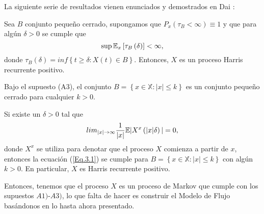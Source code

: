 La siguiente serie de resultados vienen enunciados y demostrados
en Dai \cite{Dai}:
\begin{Lema}
Sea $B$ conjunto peque\~no cerrado, supongamos que
$P_{x}\left(\tau_{B}<\infty\right)\equiv1$ y que para alg\'un
$\delta>0$ se cumple que
\begin{equation}\label{Eq.3.1}
\sup\mathbb{E}_{x}\left[\tau_{B}\left(\delta\right)\right]<\infty,
\end{equation}
donde
$\tau_{B}\left(\delta\right)=inf\left\{t\geq\delta:X\left(t\right)\in
B\right\}$. Entonces, $X$ es un proceso Harris recurrente
positivo.
\end{Lema}

\begin{Lema}\label{Lema.3.}
Bajo el supuesto (A3), el conjunto
$B=\left\{x\in\mathbb{X}:|x|\leq k\right\}$ es un conjunto
peque\~no cerrado para cualquier $k>0$.
\end{Lema}

\begin{Teo}\label{Tma.3.1}
Si existe un $\delta>0$ tal que
\begin{equation}
lim_{|x|\rightarrow\infty}\frac{1}{|x|}\mathbb{E}|X^{x}\left(|x|\delta\right)|=0,
\end{equation}
donde $X^{x}$ se utiliza para denotar que el proceso $X$ comienza
a partir de $x$, entonces la ecuaci\'on (\ref{Eq.3.1}) se cumple
para $B=\left\{x\in\mathbb{X}:|x|\leq k\right\}$ con alg\'un
$k>0$. En particular, $X$ es Harris recurrente positivo.
\end{Teo}

Entonces, tenemos que el proceso $X$ es un proceso de Markov que
cumple con los supuestos $A1)$-$A3)$, lo que falta de hacer es
construir el Modelo de Flujo bas\'andonos en lo hasta ahora
presentado.

